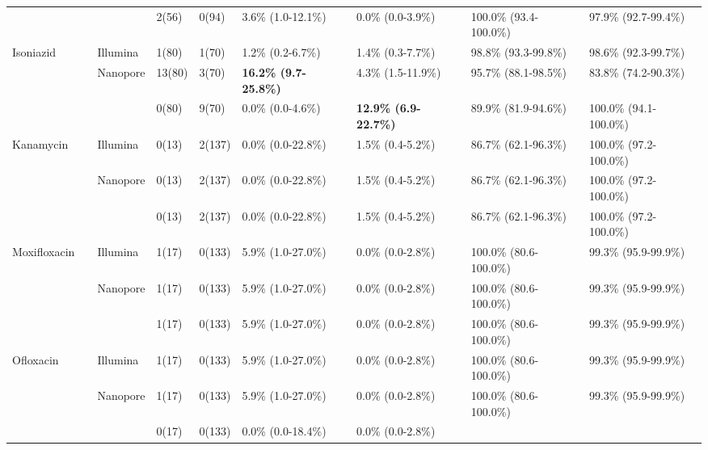 \begin{table}
{\begin{tabular}{@{}lllllllll@{}}
 &
  \mykrobe{} &
   &
  2(56) &
  0(94) &
  3.6\% (1.0-12.1\%) &
  0.0\% (0.0-3.9\%) &
  100.0\% (93.4-100.0\%) &
  97.9\% (92.7-99.4\%) \\ \cmidrule(l){2-9} 
\multirow{3}{*}{Isoniazid} &
  \multirow{2}{*}{\drprg{}} &
  Illumina &
  1(80) &
  1(70) &
  1.2\% (0.2-6.7\%) &
  1.4\% (0.3-7.7\%) &
  98.8\% (93.3-99.8\%) &
  98.6\% (92.3-99.7\%) \\
 &
   &
  \multirow{2}{*}{Nanopore} &
  13(80) &
  3(70) &
  \textbf{16.2\% (9.7-25.8\%)} &
  4.3\% (1.5-11.9\%) &
  95.7\% (88.1-98.5\%) &
  83.8\% (74.2-90.3\%) \\
 &
  \mykrobe{} &
   &
  0(80) &
  9(70) &
  0.0\% (0.0-4.6\%) &
  \textbf{12.9\% (6.9-22.7\%)} &
  89.9\% (81.9-94.6\%) &
  100.0\% (94.1-100.0\%) \\ \cmidrule(l){2-9} 
\multirow{3}{*}{Kanamycin} &
  \multirow{2}{*}{\drprg{}} &
  Illumina &
  0(13) &
  2(137) &
  0.0\% (0.0-22.8\%) &
  1.5\% (0.4-5.2\%) &
  86.7\% (62.1-96.3\%) &
  100.0\% (97.2-100.0\%) \\
 &
   &
  \multirow{2}{*}{Nanopore} &
  0(13) &
  2(137) &
  0.0\% (0.0-22.8\%) &
  1.5\% (0.4-5.2\%) &
  86.7\% (62.1-96.3\%) &
  100.0\% (97.2-100.0\%) \\
 &
  \mykrobe{} &
   &
  0(13) &
  2(137) &
  0.0\% (0.0-22.8\%) &
  1.5\% (0.4-5.2\%) &
  86.7\% (62.1-96.3\%) &
  100.0\% (97.2-100.0\%) \\ \cmidrule(l){2-9} 
\multirow{3}{*}{Moxifloxacin} &
  \multirow{2}{*}{\drprg{}} &
  Illumina &
  1(17) &
  0(133) &
  5.9\% (1.0-27.0\%) &
  0.0\% (0.0-2.8\%) &
  100.0\% (80.6-100.0\%) &
  99.3\% (95.9-99.9\%) \\
 &
   &
  \multirow{2}{*}{Nanopore} &
  1(17) &
  0(133) &
  5.9\% (1.0-27.0\%) &
  0.0\% (0.0-2.8\%) &
  100.0\% (80.6-100.0\%) &
  99.3\% (95.9-99.9\%) \\
 &
  \mykrobe{} &
   &
  1(17) &
  0(133) &
  5.9\% (1.0-27.0\%) &
  0.0\% (0.0-2.8\%) &
  100.0\% (80.6-100.0\%) &
  99.3\% (95.9-99.9\%) \\ \cmidrule(l){2-9} 
\multirow{3}{*}{Ofloxacin} &
  \multirow{2}{*}{\drprg{}} &
  Illumina &
  1(17) &
  0(133) &
  5.9\% (1.0-27.0\%) &
  0.0\% (0.0-2.8\%) &
  100.0\% (80.6-100.0\%) &
  99.3\% (95.9-99.9\%) \\
 &
   &
  \multirow{2}{*}{Nanopore} &
  1(17) &
  0(133) &
  5.9\% (1.0-27.0\%) &
  0.0\% (0.0-2.8\%) &
  100.0\% (80.6-100.0\%) &
  99.3\% (95.9-99.9\%) \\
 &
  \mykrobe{} &
   &
  0(17) &
  0(133) &
  0.0\% (0.0-18.4\%) &
  0.0\% (0.0-2.8\%) &

\end{tabular}}
\end{table}
